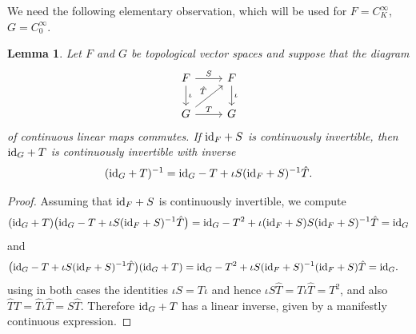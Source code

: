 \documentclass[pdftex]{sigma}
\numberwithin{equation}{section}
\newtheorem{Lemma}[Theorem]{Lemma}
\newcommand{\id}{{\rm id}}
\begin{document}
 We need the following elementary observation, which will be used for $F=C_K^\infty$, $G=C_0^\infty$.
 \begin{Lemma}\label{lem:inversetransfer}
 	Let $F$ and $G$ be topological vector spaces and suppose that the diagram
 	\begin{equation*} %
 		\begin{tikzcd}
 			F \arrow[r, "S"]\arrow[d,"\iota"] & F \arrow[d,"\iota"]\\
 			G \arrow[r, "T"]\arrow[ur,"\hat{T}"] & G
 		\end{tikzcd}
 	\end{equation*}
 	of continuous linear maps commutes. If $\id_F+S$ is continuously invertible, then
 	$\id_G+T$ is continuously invertible with inverse
 	\begin{equation*}%
 		(\id_G+ T)^{-1} = \id_G-T+\iota S(\id_F+S)^{-1}\hat{T}.
 	\end{equation*}
 \end{Lemma}
 \begin{proof}
 	Assuming that $\id_F+S$ is continuously invertible, we compute
 	\begin{align*}
 		(\id_G+T)\big(\id_G-T+\iota S(\id_F+S)^{-1}\hat{T}\big) = \id_G-T^2 + \iota (\id_F+S)S(\id_F+S)^{-1}\hat{T}=\id_G
 	\end{align*}
 	and
 	\begin{align*}
 		\big(\id_G-T+\iota S(\id_F+S)^{-1}\hat{T}\big)(\id_G+T) &= \id_G-T^2 + \iota S(\id_F+S)^{-1}(\id_F+S)\hat{T}= \id_G.
 	\end{align*}
 	using in both cases the identities $\iota S=T\iota$ and hence $\iota S \hat{T} = T\iota\hat{T}=T^2$, and also $\hat{T}T = \hat{T}\iota\hat{T} = S\hat{T}$. Therefore $\id_G+T$ has a linear inverse, given by a manifestly continuous expression.
 \end{proof}
\end{document}
